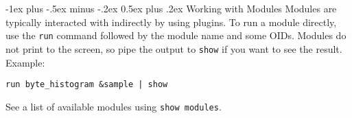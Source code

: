 \documentclass[10pt,landscape]{article}
\makeatletter
\renewcommand{\section}{\@startsection{section}{1}{0mm}%
                                {-1ex plus -.5ex minus -.2ex}%
                                {0.5ex plus .2ex}%
                                {\normalfont\large\bfseries}}
\makeatother
\begin{document}
\begin{multicols}{3}
\section{Working with Modules}
Modules are typically interacted with indirectly by using plugins.  To run a module directly, use the \verb!run! command followed by the module name and some OIDs.  
Modules do not print to the screen, so pipe the output to \verb!show! if you want to see the result.  \\
Example:
\begin{verbatim}
run byte_histogram &sample | show
\end{verbatim}
See a list of available modules using \verb!show modules!.


\end{multicols}
\end{document}
